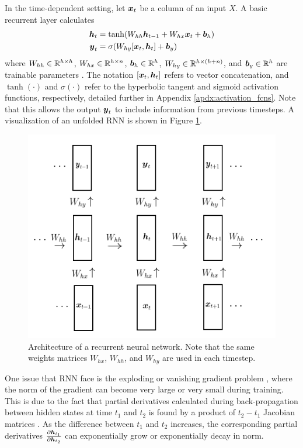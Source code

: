 In the time-dependent setting, let $\boldsymbol{x}_t$ be a column of an input $X$. A basic recurrent layer calculates 
\begin{equation}
  \begin{split}
    \boldsymbol{h}_t &= \tanh(W_{hh}\boldsymbol{h}_{t-1} + W_{hx}\boldsymbol{x}_t + \boldsymbol{b}_h) \\
    \boldsymbol{y}_t &= \sigma(W_{hy}[\boldsymbol{x}_t, \boldsymbol{h}_t] + \boldsymbol{b}_y)
\end{split}
  \label{eq:rnn_layer}
\end{equation}
where $W_{hh} \in \mathbb{R}^{h\times h}$, $W_{hx}\in \mathbb{R}^{h\times n}$, $\boldsymbol{b}_h \in \mathbb{R}^h$, $W_{hy} \in \mathbb{R}^{h \times (h+n)}$, and $\boldsymbol{b}_y \in \mathbb{R}^h$ are trainable parameters \cite{elman1990}. The notation $[\boldsymbol{x}_t, \boldsymbol{h}_t]$ refers to vector concatenation, and $\tanh(\cdot)$ and $\sigma(\cdot)$ refer to the hyperbolic tangent and sigmoid activation functions, respectively, detailed further in Appendix \ref{apdx:activation_fcns}. Note that this allows the output $\boldsymbol{y}_t$ to include information from previous timesteps. A visualization of an unfolded RNN is shown in Figure \ref{fig:rnn_visual}.

\begin{figure}[h]
  \centering
  \includegraphics[width=.5\textwidth]{img/rnn_visual.png}
  \caption{Architecture of a recurrent neural network. Note that the same weights matrices $W_{hx}$, $W_{hh}$, and $W_{hy}$ are used in each timestep.}
  \label{fig:rnn_visual}
\end{figure}

One issue that RNN face is the exploding or vanishing gradient problem \cite{bengio1994}, where the norm of the gradient can become very large or very small during training. This is due to the fact that partial derivatives calculated during back-propagation between hidden states at time $t_1$ and $t_2$ is found by a product of $t_2 - t_1$ Jacobian matrices \cite{pascanu2013}. As the difference between $t_1$ and $t_2$ increases, the corresponding partial derivatives $\frac{\partial \boldsymbol{h}_{t_1}}{\partial \boldsymbol{h}_{t_2}}$ can exponentially grow or exponentially decay in norm.

